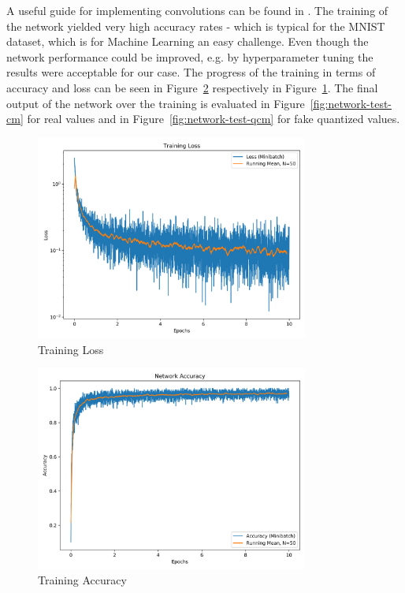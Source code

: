 A useful guide for implementing convolutions can be found in \cite{dumoulin2016guide}. The training 
of the network yielded very high accuracy rates - which is typical for the MNIST dataset, which is for
Machine Learning an easy challenge. Even though the network performance could be improved, e.g. by 
hyperparameter tuning the results were acceptable for our case. The progress of the training in terms
of accuracy and loss can be seen in Figure~\ref{fig:network-train-acc} respectively in Figure~\ref{fig:network-train-loss}.
The final output of the network over the training is evaluated in Figure~\ref{fig:network-test-cm} for real
values and in Figure~\ref{fig:network-test-qcm} for fake quantized values.

\begin{figure}[htbp]
	\centering
	\includegraphics[width=0.8\textwidth]{../../net/images/training_loss}
	\caption{Training Loss}
	\label{fig:network-train-loss}
\end{figure}

\begin{figure}[htbp]
	\centering
	\includegraphics[width=0.8\textwidth]{../../net/images/training_accuracy}
	\caption{Training Accuracy}
	\label{fig:network-train-acc}
\end{figure}

